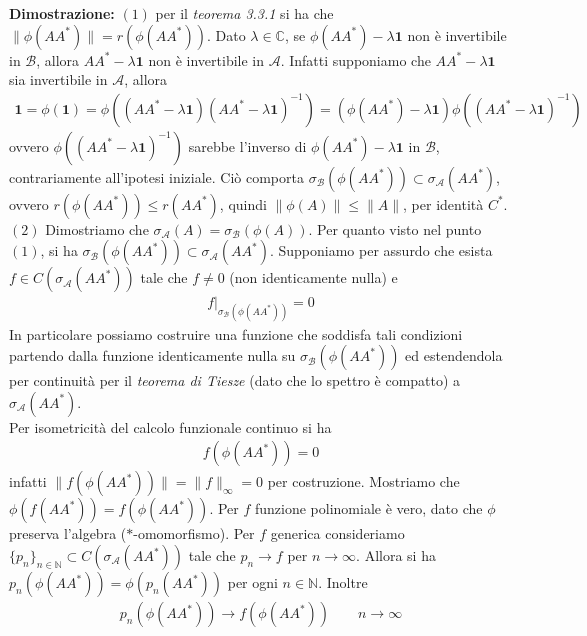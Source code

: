 \documentclass{article}
\numberwithin{equation}{subsection}
\begin{document}
\textbf{Dimostrazione:} $(1)$ per il \textit{teorema 3.3.1} si ha che $\|\phi(AA^*)\| = r(\phi(AA^*))$. Dato $\lambda \in \mathbb{C}$, se $\phi(AA^*) - \lambda\mathbf{1}$ non è invertibile in $\mathscr{B}$, allora $AA^* - \lambda\mathbf{1}$ non è invertibile in $\mathscr{A}$. Infatti supponiamo che $AA^* - \lambda\mathbf{1}$ sia invertibile in $\mathscr{A}$, allora
\begin{align*}
    \mathbf{1} = \phi(\mathbf{1}) = \phi((AA^* - \lambda\mathbf{1})(AA^* - \lambda\mathbf{1})^{-1}) = (\phi(AA^*) - \lambda\mathbf{1})\phi((AA^* - \lambda\mathbf{1})^{-1})
\end{align*}
ovvero $\phi((AA^* - \lambda\mathbf{1})^{-1})$ sarebbe l'inverso di $\phi(AA^*) - \lambda\mathbf{1}$ in $\mathscr{B}$, contrariamente all'ipotesi iniziale. Ciò comporta $\sigma_\mathscr{B}(\phi(AA^*)) \subset \sigma_\mathscr{A}(AA^*)$, ovvero $r(\phi(AA^*)) \leq r(AA^*)$, quindi $\|\phi(A)\| \leq \|A\|$, per identità $C^*$. \\
$(2)$ Dimostriamo che $\sigma_\mathscr{A}(A) = \sigma_\mathscr{B}(\phi(A))$. Per quanto visto nel punto $(1)$, si ha $\sigma_\mathscr{B}(\phi(AA^*)) \subset \sigma_\mathscr{A}(AA^*)$. Supponiamo per assurdo che esista $f \in C(\sigma_\mathscr{A}(AA^*))$ tale che $f \neq 0$ (non identicamente nulla) e
\begin{align*}
    f\vert_{\sigma_\mathscr{B}(\phi(AA^*))} = 0
\end{align*}
In particolare possiamo costruire una funzione che soddisfa tali condizioni partendo dalla funzione identicamente nulla su $\sigma_\mathscr{B}(\phi(AA^*))$ ed estendendola per continuità per il \textit{teorema di Tiesze} (dato che lo spettro è compatto) a $\sigma_\mathscr{A}(AA^*)$. \\
Per isometricità del calcolo funzionale continuo si ha
\begin{align*}
    f(\phi(AA^*)) = 0
\end{align*}
infatti $\|f(\phi(AA^*))\| = \|f\|_\infty = 0$ per costruzione. Mostriamo che $\phi(f(AA^*)) = f(\phi(AA^*))$. Per $f$ funzione polinomiale è vero, dato che $\phi$ preserva l'algebra ($*$-omomorfismo). Per $f$ generica consideriamo $\{p_n\}_{n \in \mathbb{N}} \subset C(\sigma_\mathscr{A}(AA^*))$ tale che $p_n \rightarrow f$ per $n \rightarrow \infty$. Allora si ha $p_n(\phi(AA^*)) = \phi(p_n(AA^*))$ per ogni $n \in \mathbb{N}$. Inoltre 
\begin{align*}
    p_n(\phi(AA^*)) \rightarrow f(\phi(AA^*)) \qquad n \rightarrow \infty
\end{align*}
\end{document}
